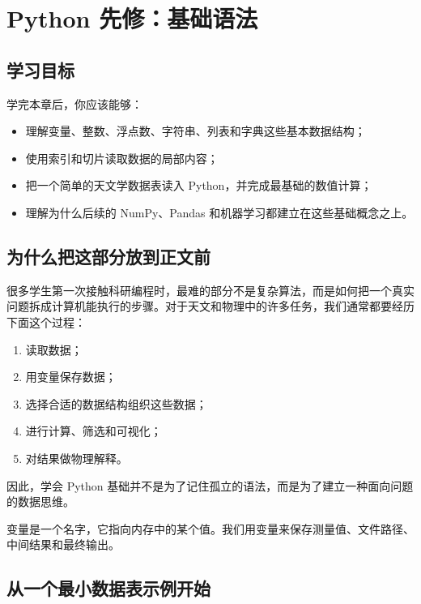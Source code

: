 \chapter{Python 先修：基础语法}

\section{学习目标}

学完本章后，你应该能够：

\begin{itemize}
    \item 理解变量、整数、浮点数、字符串、列表和字典这些基本数据结构；
    \item 使用索引和切片读取数据的局部内容；
    \item 把一个简单的天文学数据表读入 Python，并完成最基础的数值计算；
    \item 理解为什么后续的 NumPy、Pandas 和机器学习都建立在这些基础概念之上。
\end{itemize}

\section{为什么把这部分放到正文前}

很多学生第一次接触科研编程时，最难的部分不是复杂算法，而是如何把一个真实问题拆成计算机能执行的步骤。对于天文和物理中的许多任务，我们通常都要经历下面这个过程：

\begin{enumerate}
    \item 读取数据；
    \item 用变量保存数据；
    \item 选择合适的数据结构组织这些数据；
    \item 进行计算、筛选和可视化；
    \item 对结果做物理解释。
\end{enumerate}

因此，学会 Python 基础并不是为了记住孤立的语法，而是为了建立一种面向问题的数据思维。

\begin{defbox}[变量]
变量是一个名字，它指向内存中的某个值。我们用变量来保存测量值、文件路径、中间结果和最终输出。
\end{defbox}

\section{从一个最小数据表示例开始}

